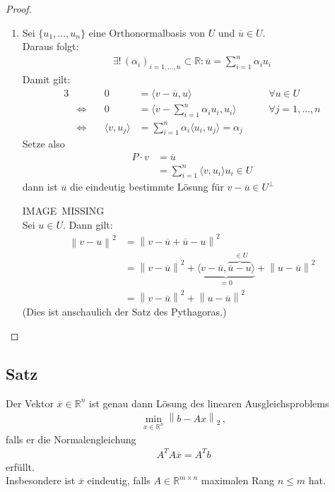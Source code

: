 \documentclass[ngerman,fontsize=11pt, paper=a4, parskip=half, titlepage=true, toc=bib]{scrbook}
\newcommand{\R}{\mathds{R}}
\newcommand{\Ren}{\mathds{R}^{n}}
\newcommand{\nn}[1]{\left\| #1 \right\|}
\newcommand{\scp}[2]{\langle #1, #2 \rangle}
\begin{document}
  \begin{proof}
    \begin{enumerate}[1)]
    \item Sei $\{u_1, \dots , u_n \}$ eine Orthonormalbasis von $U$ 
      und $\overline{u}\in U $. \\
      Daraus folgt:
      \begin{gather*}
        \exists ! \, (\alpha_i)_{i=1,\dotsc,n} \subset \R: \overline{u} = \sum_{i=1}^{n} \alpha_i u_i
      \end{gather*}
      Damit gilt:
      \begin{alignat*}{3}
        &&0 &= \scp{v-\overline{u}}{u} &\quad& \forall u \in U \\
        &\Longleftrightarrow \quad& 0 &= \scp{v- \sum_{i=1}^{n} \alpha_i u_i}{u_i} &\quad &\forall j=1, \dots , n\\
        &\Longleftrightarrow  & \scp{v}{u_j} &= \sum_{i=1}^{n} \alpha_i \scp{u_i}{u_j} = \alpha_j
      \end{alignat*}
      Setze also 
      \begin{align}
        \nonumber
        P\cdot v &= \overline{u} \\
                 & = \sum_{i=1}^{n} \scp{v}{u_i} u_i \in U
                   \label{IV.3.4}
      \end{align}
      dann ist $\overline{u}$ die eindeutig bestimmte Lösung für $ v-\overline{u} \in U^\bot$
      
      IMAGE~MISSING \\
      
      Sei  $u\in U$. Dann gilt:
      \begin{align}
        \nonumber
        \nn{v-u}^2 &= \nn{v-\overline{u}+\overline{u} -u}^2 \\ \nonumber
                   &= \nn{v-\overline{u}}^2 +
                     \underbrace{\scp{v-\overline{u}}{\overbrace{\overline{u}-u}^{~~\in U}}}_{=0}
                     + \nn{u-\overline{u}}^2 \\
                   &= \nn{v-\overline{u}}^2 + \nn{u-\overline{u}}^2
                     \label{IV.3.5}
      \end{align}
      (Dies ist anschaulich der Satz des Pythagoras.)
    \end{enumerate}
  \end{proof}
  
  \subsection{Satz} 
  Der Vektor $\overline{x} \in\R^n$ ist genau dann Lösung des linearen Ausgleichsproblems
  \begin{gather*}
    \min_{x\in\Ren} \nn{b-Ax}_2 \, ,
  \end{gather*}
  falls er die Normalengleichung
  \begin{gather}
    A^TA\overline{x} = A^Tb
    \label{IV.3.6}
  \end{gather}
  erfüllt. \\
  Insbesondere ist $\overline{x}$ eindeutig,
  falls $A\in \R^{m\times n}$ maximalen Rang $n\leq m$ hat.
  
\end{document}

